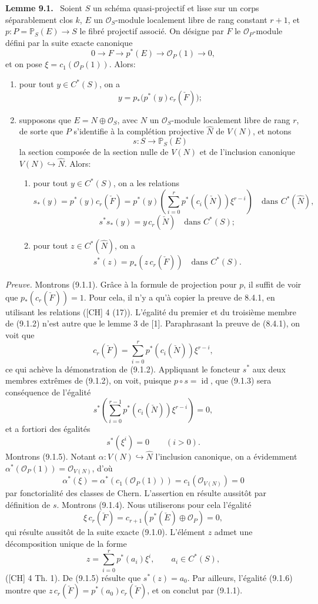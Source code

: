 \documentclass[11pt]{article}
\newenvironment{statement}[1]{\par\medskip\noindent\textbf{#1.}\ }{\par\medskip}
\begin{document}
\begin{statement}{Lemme 9.1}
Soient $S$ un schéma quasi-projectif et lisse sur un corps séparablement clos $k$, $E$ un $\mathcal O_S$-module localement libre de rang constant $r+1$, et $p:P=\mathbb P_S(E)\to S$ le fibré projectif associé. On désigne par $F$ le $\mathcal O_P$-module défini par la suite exacte canonique
\[
0\to F\to p^*(E)\to\mathcal O_P(1)\to0,
\tag{9.1.0}
\]
et on pose $\xi=c_1(\mathcal O_P(1))$. Alors:
\begin{enumerate}[label=(\roman*)]
\item pour tout $y\in C^*(S)$, on a
\[
y=p_*\bigl(p^*(y)c_r(\check F)\bigr);
\tag{9.1.1}
\]
\item supposons que $E=N\oplus\mathcal O_S$, avec $N$ un $\mathcal O_S$-module localement libre de rang $r$, de sorte que $P$ s'identifie à la complétion projective $\widehat N$ de $V(N)$, et notons
\[
s:S\to\mathbb P_S(E)
\]
la section composée de la section nulle de $V(N)$ et de l'inclusion canonique $V(N)\hookrightarrow\widehat N$. Alors:
\begin{enumerate}[label=(\alph*)]
\item pour tout $y\in C^*(S)$, on a les relations
\[
s_*(y)=p^*(y)c_r(\check F)=p^*(y)\left(\sum_{i=0}^r p^*(c_i(\check N))\xi^{r-i}\right)
\quad\text{dans }C^*(\widehat N),
\tag{9.1.2}
\]
\[
s^*s_*(y)=y\,c_r(\check N)\quad\text{dans }C^*(S);
\tag{9.1.3}
\]
\item pour tout $z\in C^*(\widehat N)$, on a
\[
s^*(z)=p_*(z\,c_r(\check F))\quad\text{dans }C^*(S).
\tag{9.1.4}
\]
\end{enumerate}
\end{enumerate}
\end{statement}

\emph{Preuve.} Montrons (9.1.1). Grâce à la formule de projection pour $p$, il suffit de voir que $p_*(c_r(\check F))=1$. Pour cela, il n'y a qu'à copier la preuve de 8.4.1, en utilisant les relations ([CH] 4 (17)). L'égalité du premier et du troisième membre de (9.1.2) n'est autre que le lemme 3 de [1]. Paraphrasant la preuve de (8.4.1), on voit que
\[
c_r(\check F)=\sum_{i=0}^r p^*(c_i(\check N))\xi^{r-i},
\tag{9.1.2 bis}
\]
ce qui achève la démonstration de (9.1.2). Appliquant le foncteur $s^*$ aux deux membres extrêmes de (9.1.2), on voit, puisque $p\circ s=\operatorname{id}$, que (9.1.3) sera conséquence de l'égalité
\[
s^*\left(\sum_{i=0}^{r-1}p^*(c_i(\check N))\xi^{r-i}\right)=0,
\]
et a fortiori des égalités
\[
s^*(\xi^i)=0\qquad(i>0).
\tag{9.1.5}
\]
Montrons (9.1.5). Notant $\alpha:V(N)\hookrightarrow\widehat N$ l'inclusion canonique, on a évidemment $\alpha^*(\mathcal O_P(1))=\mathcal O_{V(N)}$, d'où
\[
\alpha^*(\xi)=\alpha^*(c_1(\mathcal O_P(1)))=c_1(\mathcal O_{V(N)})=0
\]
par fonctorialité des classes de Chern. L'assertion en résulte aussitôt par définition de $s$. Montrons (9.1.4). Nous utiliserons pour cela l'égalité
\[
\xi\,c_r(\check F)=c_{r+1}(p^*(\check E)\oplus\mathcal O_P)=0,
\tag{9.1.6}
\]
qui résulte aussitôt de la suite exacte (9.1.0). L'élément $z$ admet une décomposition unique de la forme
\[
z=\sum_{i=0}^r p^*(a_i)\xi^i,\qquad a_i\in C^*(S),
\]
([CH] 4 Th. 1). De (9.1.5) résulte que $s^*(z)=a_0$. Par ailleurs, l'égalité (9.1.6) montre que $z\,c_r(\check F)=p^*(a_0)c_r(\check F)$, et on conclut par (9.1.1).
\end{document}
